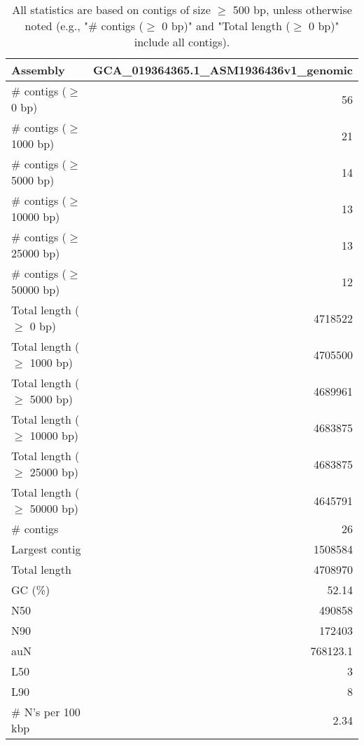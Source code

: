 \documentclass[12pt,a4paper]{article}
\begin{document}
\begin{table}[ht]
\begin{center}
\caption{All statistics are based on contigs of size $\geq$ 500 bp, unless otherwise noted (e.g., "\# contigs ($\geq$ 0 bp)" and "Total length ($\geq$ 0 bp)" include all contigs).}
\begin{tabular}{|l*{1}{|r}|}
\hline
Assembly & GCA\_019364365.1\_ASM1936436v1\_genomic \\ \hline
\# contigs ($\geq$ 0 bp) & 56 \\ \hline
\# contigs ($\geq$ 1000 bp) & 21 \\ \hline
\# contigs ($\geq$ 5000 bp) & 14 \\ \hline
\# contigs ($\geq$ 10000 bp) & 13 \\ \hline
\# contigs ($\geq$ 25000 bp) & 13 \\ \hline
\# contigs ($\geq$ 50000 bp) & 12 \\ \hline
Total length ($\geq$ 0 bp) & 4718522 \\ \hline
Total length ($\geq$ 1000 bp) & 4705500 \\ \hline
Total length ($\geq$ 5000 bp) & 4689961 \\ \hline
Total length ($\geq$ 10000 bp) & 4683875 \\ \hline
Total length ($\geq$ 25000 bp) & 4683875 \\ \hline
Total length ($\geq$ 50000 bp) & 4645791 \\ \hline
\# contigs & 26 \\ \hline
Largest contig & 1508584 \\ \hline
Total length & 4708970 \\ \hline
GC (\%) & 52.14 \\ \hline
N50 & 490858 \\ \hline
N90 & 172403 \\ \hline
auN & 768123.1 \\ \hline
L50 & 3 \\ \hline
L90 & 8 \\ \hline
\# N's per 100 kbp & 2.34 \\ \hline
\end{tabular}
\end{center}
\end{table}
\end{document}
